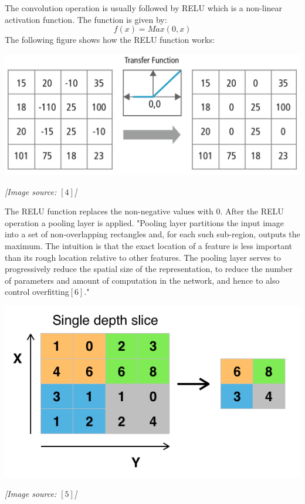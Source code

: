 \documentclass{article}
\begin{document}
The convolution operation is usually followed by RELU which is a non-linear activation function. The function is given by:
$$f(x) = Max(0, x)$$
The following figure shows how the RELU function works:
\begin{center}
	\includegraphics[scale=0.2]{relu}
\end{center}
\begin{center}
		\textit{[Image source: ${[4]}$]}
\end{center}
The RELU function replaces the non-negative values with 0. After the RELU operation a pooling layer is applied. "Pooling layer partitions the input image into a set of non-overlapping rectangles and, for each such sub-region, outputs the maximum. The intuition is that the exact location of a feature is less important than its rough location relative to other features. The pooling layer serves to progressively reduce the spatial size of the representation, to reduce the number of parameters and amount of computation in the network, and hence to also control overfitting${[6]}$."
\begin{center}
	\includegraphics[scale=0.2]{max_pooling}
\end{center}
\begin{center}
	\textit{[Image source: ${[5]}$]}
\end{center}
\end{document}
